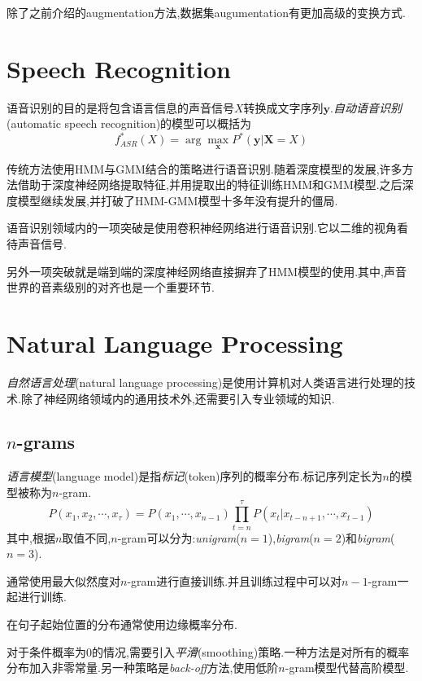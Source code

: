 除了之前介绍的augmentation方法,数据集augumentation有更加高级的变换方式.

\section{Speech Recognition}

语音识别的目的是将包含语言信息的声音信号$\mathit X$转换成文字序列$\mathbf y$.\textit{自动语音识别}(automatic speech recognition)的模型可以概括为
\begin{equation}
f^\ast_{ASR}(\mathit X)=\arg\max_{\mathbf x}P^\ast(\mathbf y|\mathbf X=\mathit X)
\end{equation}

传统方法使用HMM与GMM结合的策略进行语音识别.随着深度模型的发展,许多方法借助于深度神经网络提取特征,并用提取出的特征训练HMM和GMM模型.之后深度模型继续发展,并打破了HMM-GMM模型十多年没有提升的僵局.

语音识别领域内的一项突破是使用卷积神经网络进行语音识别.它以二维的视角看待声音信号.

另外一项突破就是端到端的深度神经网络直接摒弃了HMM模型的使用.其中,声音世界的音素级别的对齐也是一个重要环节.

\section{Natural Language Processing}

\textit{自然语言处理}(natural language processing)是使用计算机对人类语言进行处理的技术.除了神经网络领域内的通用技术外,还需要引入专业领域的知识.

\subsection{$n$-grams}

\textit{语言模型}(language model)是指\textit{标记}(token)序列的概率分布.标记序列定长为$n$的模型被称为$n$-gram.
\begin{equation}
P(x_1,x_2,\cdots,x_\tau)=P(x_1,\cdots,x_{n-1})\prod_{t=n}^\tau P(x_t|x_{t-n+1},\cdots,x_{t-1})
\end{equation}
其中,根据$n$取值不同,$n$-gram可以分为:\textit{unigram}($n=1$),\textit{bigram}($n=2$)和\textit{bigram}($n=3$).

通常使用最大似然度对$n$-gram进行直接训练.并且训练过程中可以对$n-1$-gram一起进行训练.

在句子起始位置的分布通常使用边缘概率分布.

对于条件概率为$0$的情况,需要引入\textit{平滑}(smoothing)策略.一种方法是对所有的概率分布加入非零常量.另一种策略是\textit{back-off}方法,使用低阶$n$-gram模型代替高阶模型.

